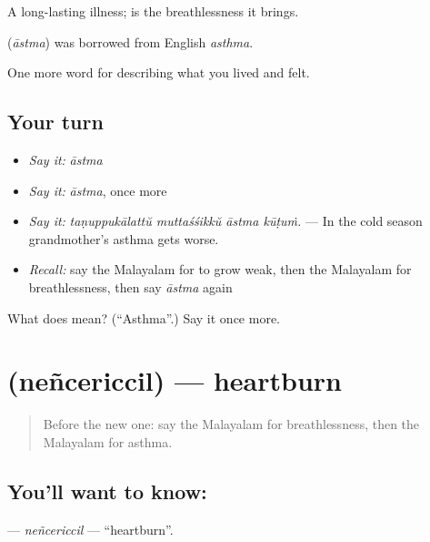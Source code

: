 A long-lasting illness;  is the breathlessness it brings.

\begin{cousinweb}
\textbf{} (\emph{āstma}) was borrowed from English \emph{asthma}.
\end{cousinweb}

\begin{grammarlens}[title={What you've built}]
One more word for describing what you lived and felt.
\end{grammarlens}

\subsection*{Your turn}
\begin{itemize}
\raggedright
  \item \emph{Say it:} \emph{āstma}
  \item \emph{Say it:} \emph{āstma}, once more
  \item \emph{Say it:} \emph{taṇuppukālattŭ muttaśśikkŭ āstma kūṭuṁ.} — In the cold season grandmother's asthma gets worse.
  \item \emph{Recall:} say the Malayalam for to grow weak, then the Malayalam for breathlessness, then say \emph{āstma} again
\end{itemize}

\begin{tcolorbox}[breakable,colback=teal!4,colframe=teal!35!black,title={Before you move on}]
What does  mean? (\textquotedblleft{}Asthma\textquotedblright{}.) Say it once more.
\end{tcolorbox}
\section[\texorpdfstring{\ml{നെഞ്ചെരിച്ചിൽ} (neñcericcil)}{നെഞ്ചെരിച്ചിൽ (neñcericcil)}]{ (neñcericcil) — heartburn}

\label{lesson:ML-C534-nencericcil}



\begin{quote}
Before the new one: say the Malayalam for breathlessness, then the Malayalam for asthma.
\end{quote}

\subsection*{You'll want to know: }
\textbf{} — \emph{neñcericcil} — \textquotedblleft{}heartburn\textquotedblright{}.

